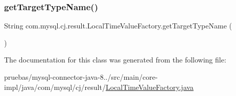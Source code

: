 \mbox{\label{classcom_1_1mysql_1_1cj_1_1result_1_1_local_time_value_factory_a3419a70fb7929d61229bf3df0f3a12a7}} 
\subsubsection{\texorpdfstring{get\+Target\+Type\+Name()}{getTargetTypeName()}}
{\footnotesize\ttfamily String com.\+mysql.\+cj.\+result.\+Local\+Time\+Value\+Factory.\+get\+Target\+Type\+Name (\begin{DoxyParamCaption}{ }\end{DoxyParamCaption})}



The documentation for this class was generated from the following file\+:\begin{DoxyCompactItemize}
\item 
pruebas/mysql-\/connector-\/java-\/8../src/main/core-\/impl/java/com/mysql/cj/result/\mbox{\hyperlink{_local_time_value_factory_8java}{Local\+Time\+Value\+Factory.\+java}}\end{DoxyCompactItemize}
